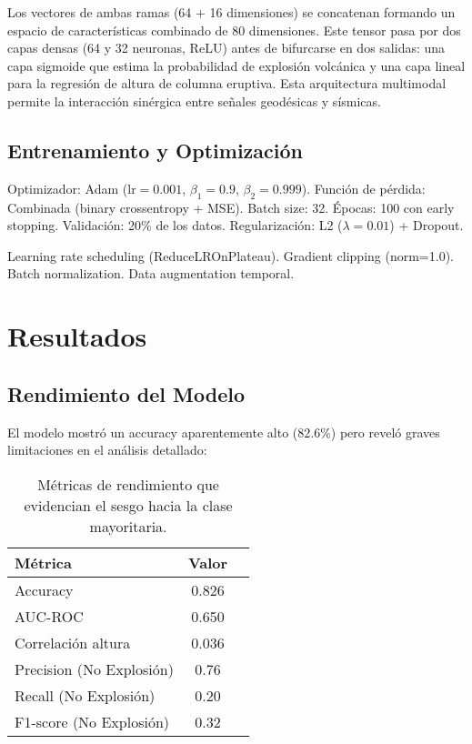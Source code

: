 \documentclass[11pt,a4paper]{article}
\begin{document}
Los vectores de ambas ramas (64 + 16 dimensiones) se concatenan formando un espacio de características combinado de 80 dimensiones. Este tensor pasa por dos capas densas (64 y 32 neuronas, ReLU) antes de bifurcarse en dos salidas: una capa sigmoide que estima la probabilidad de explosión volcánica y una capa lineal para la regresión de altura de columna eruptiva. Esta arquitectura multimodal permite la interacción sinérgica entre señales geodésicas y sísmicas.

\subsection{Entrenamiento y Optimización}

Optimizador: Adam ($\text{lr}=0.001$, $\beta_1=0.9$, $\beta_2=0.999$).
Función de pérdida: Combinada (binary crossentropy + MSE).
Batch size: 32.
Épocas: 100 con early stopping.
Validación: 20\% de los datos.
Regularización: L2 ($\lambda=0.01$) + Dropout.

Learning rate scheduling (ReduceLROnPlateau).
Gradient clipping (norm=1.0).
Batch normalization.
Data augmentation temporal.

\section{Resultados}

\subsection{Rendimiento del Modelo}

El modelo mostró un accuracy aparentemente alto (82.6\%) pero reveló graves limitaciones en el análisis detallado:

\begin{table}[H]
    \centering
    \begin{tabular}{lcc}
        \toprule
        Métrica & Valor \\
        \midrule
        Accuracy & 0.826 \\
        AUC-ROC & 0.650 \\
        Correlación altura & 0.036 \\
        Precision (No Explosión) & 0.76 \\
        Recall (No Explosión) & 0.20 \\
        F1-score (No Explosión) & 0.32 \\
        \bottomrule
    \end{tabular}
    \caption{Métricas de rendimiento que evidencian el sesgo hacia la clase mayoritaria.}
    \label{tab:metricas}
\end{table}
\end{document}
